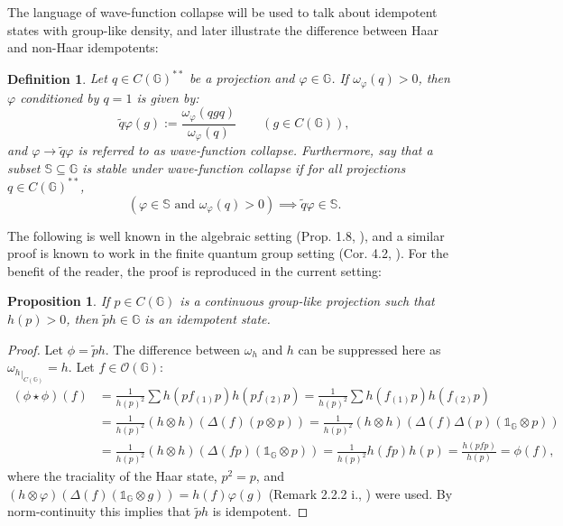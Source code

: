 \documentclass[12pt]{amsart}
\newtheorem{definition}[theorem]{Definition}
\newtheorem{proposition}[theorem]{Proposition}
\theoremstyle{remark}
\theoremstyle{remark}
\begin{document}
\bigskip

The language of wave-function collapse will be used to talk about idempotent states with group-like density, and later illustrate the difference between Haar and non-Haar idempotents:

\begin{definition}\label{condition}
Let $q\in C(\mathbb{G})^{**}$ be a projection and $\varphi\in \mathbb{G}$. If $\omega_{\varphi}(q)>0$, then  \emph{$\varphi$ conditioned by $q=1$} is given by:
$$\widetilde{q}\varphi(g):=\frac{\omega_\varphi(qg q)}{\omega_\varphi(q)}\qquad (g\in C(\mathbb{G})),$$
and  $\varphi\to \widetilde{q}\varphi$ is referred to as \emph{wave-function collapse}. Furthermore, say that a subset $\mathbb{S}\subseteq \mathbb{G}$ is \emph{stable under wave-function collapse} if for all projections $q\in C(\mathbb{G})^{**}$,
\begin{equation}(\varphi\in\mathbb{S}\text{ and }\omega_{\varphi}(q)>0)\implies \widetilde{q}\varphi\in \mathbb{S}.\label{wfc}\end{equation}
\end{definition}

The following is well known in the algebraic setting  (Prop. 1.8, \cite{lvd}), and a similar proof is known to work in the finite quantum group setting (Cor. 4.2, \cite{frs}). For the benefit of the reader, the proof is reproduced in the current setting:
\begin{proposition}\label{prop8.3}
If $p\in C(\mathbb{G})$ is a continuous group-like projection such that $h(p)>0$,  then $\widetilde{p}h\in\mathbb{G}$ is an idempotent state.
\end{proposition}
\begin{proof}Let $\phi=\widetilde{p}h$. The difference between $\omega_h$ and $h$ can be suppressed here as ${\omega_h}_{\left.\right|_{C(\mathbb{G})}}=h$. Let $f\in \mathcal{O}(\mathbb{G})$:
\begin{align*}
  (\phi\star\phi)(f) & =\frac{1}{h(p)^2}\sum h(pf_{(1)}p)h(pf_{(2)}p)
 =\frac{1}{h(p)^2}\sum h(f_{(1)}p)h(f_{(2)}p) \\
   & =\frac{1}{h(p)^2}(h\otimes h)\left(\Delta(f)(p\otimes p)\right)  =\frac{1}{h(p)^2}(h\otimes h)\left(\Delta(f)\Delta(p)(\mathds{1}_{\mathbb{G}}\otimes p)\right)
   \\&=\frac{1}{h(p)^2}(h\otimes h)\left(\Delta(fp)(\mathds{1}_{\mathbb{G}}\otimes p)\right)  =\frac{1}{h(p)^2}h(fp)h(p)=\frac{h(pfp)}{h(p)}=\phi(f),
\end{align*}
where the traciality of the Haar state, $p^2=p$, and $(h\otimes \varphi)(\Delta(f)(\mathds{1}_{\mathbb{G}}\otimes g))=h(f)\varphi(g)$ (Remark 2.2.2 i., \cite{tim}) were used. By norm-continuity this implies that $\widetilde{p}h$ is idempotent.
\end{proof}
\end{document}
